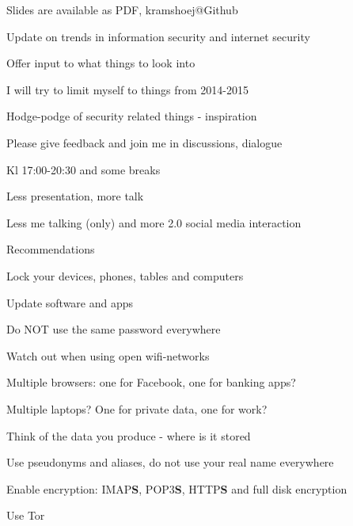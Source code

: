 \documentclass[20pt,landscape,a4paper,footrule]{foils}
\begin{document}


\vskip 2cm
\centerline{\tiny Slides are available as PDF, kramshoej@Github}



\begin{list1}
\item Update on trends in information security and internet security
\item Offer input to what things to look into
\item I will try to limit myself to things from 2014-2015
\item Hodge-podge of security related things - inspiration
\item Please give feedback and join me in discussions, dialogue \smiley
\end{list1}



\begin{list1}
\item Kl 17:00-20:30 and some breaks
\item Less presentation, more talk
\item Less me talking (only) and more 2.0 social media interaction
\end{list1}


Recommendations 
\begin{list2}
\item Lock your devices, phones, tables and computers
\item Update software and apps
\item Do NOT use the same password everywhere
\item Watch out when using open wifi-networks
\item Multiple browsers: one for Facebook, one for banking apps?
\item Multiple laptops? One for private data, one for work?
\item Think of the data you produce - where is it stored
\item Use pseudonyms and aliases, do not use your real name everywhere
\item Enable encryption: IMAP{\bf S}, POP3{\bf S},
  HTTP{\bf S} and full disk encryption
\item Use Tor 
\end{list2}
\end{document}

